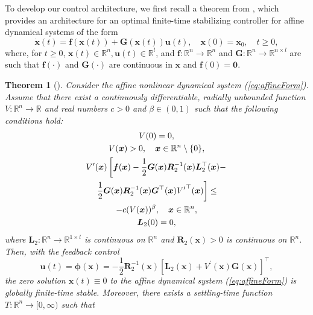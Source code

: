 \documentclass[lettersize,journal]{IEEEtran}
\newtheorem{theorem}{Theorem}
\begin{document}
To develop our control architecture, we first recall a theorem from \cite{haddad2015finite}, which provides an architecture for an optimal finite-time stabilizing controller for affine dynamical systems of the form
\begin{equation}\label{eq:affineForm}  
\dot{\bm{x}}(t) = \bm{f}(\bm{x}(t)) + \bm{G}(\bm{x}(t))\bm{u}(t), \quad \bm{x}(0) = \bm{x}_0, \quad t \geq 0,
\end{equation}
where, for $t \geq 0$, $\bm{x}(t) \in \mathbb{R}^{n}, \bm{u}(t) \in \mathbb{R}^{l}$, and $\bm{f}:\mathbb{R}^{n} \rightarrow \mathbb{R}^{n}$ and $\bm{G}: \mathbb{R}^{n} \rightarrow \mathbb{R}^{n \times l}$ are such that $\bm{f}(\cdot)$ and $\bm{G}(\cdot)$ are continuous in $\bm{x}$ and $\bm{f}(0) = \bm{0}$. 
\begin{theorem}[\cite{haddad2015finite}]\label{th:baseline}
Consider the affine nonlinear dynamical system (\ref{eq:affineForm}). Assume that there exist a continuously differentiable, radially unbounded function $V : \mathbb{R}^{n} \rightarrow \mathbb{R}$ and real numbers $c > 0$ and $\beta \in (0, 1)$ such that the following conditions hold:
\begin{gather}
V(0) = 0, \label{eq:cond1}\\ 
V(\bm{x}) > 0, \quad \bm{x} \in \mathbb{R}^{n} \setminus \{0\}, \label{eq:cond2}\\ 
V^\prime(\bm{x}) \left[\bm{f}(\bm{x}) - \frac{1}{2}\bm{G}(\bm{x})\bm{R}^{-1}_2(\bm{x})\bm{L}^\top_2(\bm{x}) - \right. \notag\\ 
\left. \frac{1}{2} \bm{G}(\bm{x})\bm{R}^{-1}_2(\bm{x})\bm{G}^\top(\bm{x}) {V^{\prime}}^\top(\bm{x})\right] \leq \notag\\
- c(V(\bm{x}))^\beta, \quad \bm{x} \in \mathbb{R}^{n}, \label{eq:cond3}\\ 
\bm{L}_2(0) = 0, \label{eq:cond4} 
\end{gather}
where $\bm{L}_2 : \mathbb{R}^{n} \rightarrow \mathbb{R}^{1 \times l}$ is continuous on $\mathbb{R}^{n}$ and $\bm{R}_2(\bm{x}) > 0$ is continuous on $\mathbb{R}^{n}$. Then, with the feedback control 
\begin{equation}\label{eq:uOld}
\bm{u}(t) = \bm{\phi}(\bm{x}) = - \frac{1}{2}\bm{R}^{-1}_2(\bm{x})\left[\bm{L}_2(\bm{x}) + V^\prime(\bm{x})\bm{G}(\bm{x})\right]^\top,   
\end{equation}
the zero solution $\bm{x}(t) \equiv 0$ to the affine dynamical system (\ref{eq:affineForm}) is globally finite-time stable. Moreover, there exists a settling-time function $T : \mathbb{R}^{n} \rightarrow [0, \infty)$ such that

\end{theorem}
\end{document}
